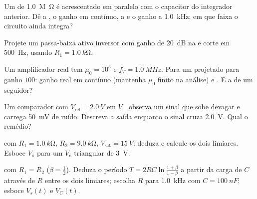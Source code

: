 \begin{exercise}[$\star\star$]\label{exo:b1:operational-amplifier:7}
Um  de \qty{1.0}{M\ohm} é acrescentado em paralelo com o capacitor do
integrador anterior. Dê a , o ganho em contínuo, a
 e o ganho a \qty{1.0}{kHz}; em que faixa o
circuito ainda integra?
\end{exercise}

\begin{exercise}[$\star\star$]\label{exo:b1:operational-amplifier:8}
Projete um passa-baixa ativo inversor com ganho de \qty{20}{dB} na
 e corte em \qty{500}{Hz}, usando $R_1 = \qty{1.0}{k\ohm}$.
\end{exercise}

\begin{exercise}[$\star\star$]\label{exo:b1:operational-amplifier:9}
Um amplificador real tem $\mu_0 = 10^5$ e $f_T = \qty{1.0}{MHz}$. Para um
 projetado para ganho $100$: ganho real em contínuo
(mantenha $\mu_0$ finito na análise) e . E a  de um
seguidor?
\end{exercise}

\begin{exercise}[$\star\star\star$]\label{exo:b1:operational-amplifier:10}
Um comparador com $V_{\mathrm{ref}} = \qty{2.0}{V}$ em $V_-$ observa um
sinal que sobe devagar e carrega \qty{50}{mV} de ruído. Descreva a saída
enquanto o sinal cruza \qty{2.0}{V}. Qual o remédio?
\end{exercise}

\begin{exercise}[$\star\star\star$]\label{exo:b1:operational-amplifier:11}
 com $R_1 = \qty{1.0}{k\ohm}$, $R_2 = \qty{9.0}{k\ohm}$,
$V_{\mathrm{sat}} = \qty{15}{V}$: deduza e calcule os dois limiares.
Esboce $V_s$ para um $V_e$ triangular de  \qty{3}{V}.
\end{exercise}

\begin{exercise}[$\star\star\star$]\label{exo:b1:operational-amplifier:12}
 com $R_1 = R_2$ ($\beta = \tfrac12$). Deduza o
período $T = 2RC\ln\frac{1 + \beta}{1 - \beta}$ a partir da carga de $C$
através de $R$ entre os dois limiares; escolha $R$ para \qty{1.0}{kHz}
com $C = \qty{100}{nF}$; esboce $V_s(t)$ e $V_C(t)$.
\end{exercise}

